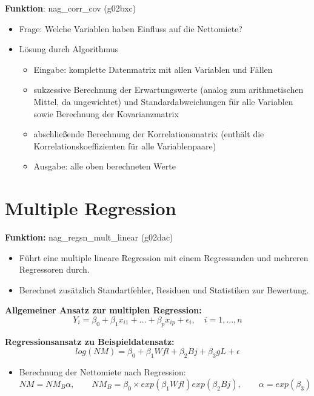 \documentclass[a4paper]{article}
\begin{document}
{\bf Funktion}: nag\_corr\_cov (g02bxc)\cite{nag:intro}
\begin{itemize}
	\item Frage: Welche Variablen haben Einfluss auf die Nettomiete?
	\item Lösung durch Algorithmus
		\begin{itemize}
			\item Eingabe: komplette Datenmatrix mit allen Variablen und Fällen
			\item sukzessive Berechnung der Erwartungswerte (analog zum arithmetischen Mittel, da ungewichtet) und Standardabweichungen für alle Variablen sowie Berechnung der Kovarianzmatrix
			\item abschließende Berechnung der Korrelationsmatrix (enthält die Korrelationskoeffizienten für alle Variablenpaare)
			\item Ausgabe: alle oben berechneten Werte
		\end{itemize}
	\end{itemize}

\section*{Multiple Regression}

{\bf Funktion:} nag\_regsn\_mult\_linear (g02dac)\cite{nag:intro}
\begin{itemize}
\item Führt eine multiple lineare Regression mit einem Regressanden und mehreren Regressoren durch.
\item Berechnet zusätzlich Standartfehler, Residuen und Statistiken zur Bewertung.
\end{itemize}

{\bf Allgemeiner Ansatz zur multiplen Regression:}
\begin{equation*}
  Y_i = \beta_0 + \beta_1 x_{i1} + \dots + \beta_p x_{ip} + \epsilon_i, \quad i = 1, \dots, n
\end{equation*}

{\bf Regressionsansatz zu Beispieldatensatz:}
\begin{equation*}
  log(NM) = \beta_0 + \beta_1 Wfl + \beta_2 Bj + \beta_3 gL + \epsilon
\end{equation*}
\begin{itemize}
\item Berechnung der Nettomiete nach Regression:
  \begin{equation*}
    NM = NM_B \alpha,\qquad
    NM_B = \beta_0 \times exp(\beta_1 Wfl) exp(\beta_2 Bj),\qquad
    \alpha = exp(\beta_3)
  \end{equation*}
\end{itemize}
\end{document}
